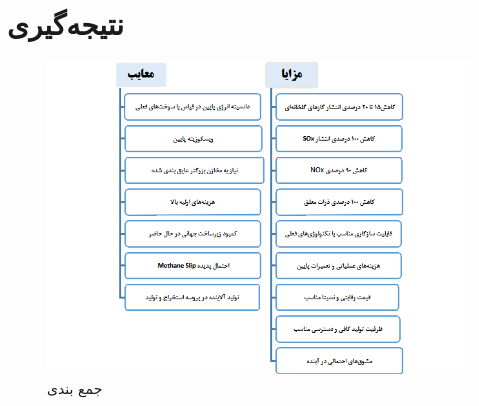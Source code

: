 \section{نتیجه‌گیری}
\begin{figure}[!h]
	\centering
	\includegraphics[width=20cm]{Figures/LNG/conv.png}
	\caption{جمع بندی}\label{conv}
\end{figure}



